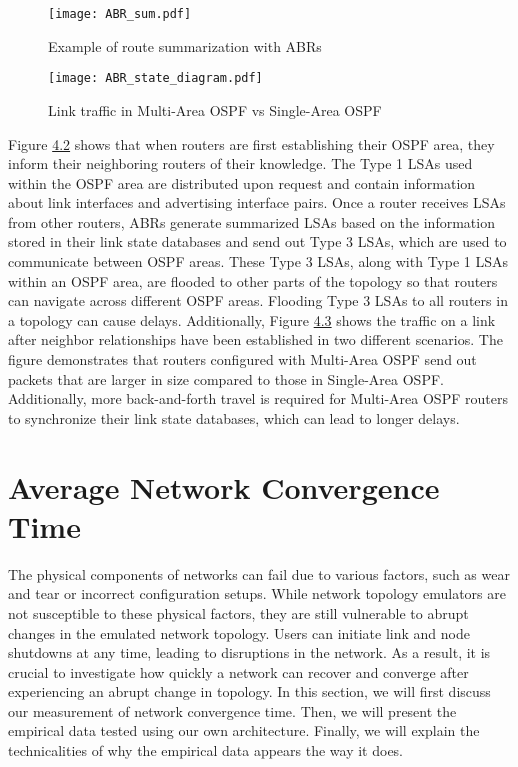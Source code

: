 \documentclass{uiucthesis2021}
\begin{document}
\label{f42}
\begin{figure}[H]
\texttt{[image: ABR\_sum.pdf]}
\centering
\caption{Example of route summarization with ABRs}
\centering
\end{figure}

\label{f43}
\begin{figure}[H]
\texttt{[image: ABR\_state\_diagram.pdf]}
\centering
\caption{Link traffic in Multi-Area OSPF vs Single-Area OSPF}
\centering
\end{figure}

\noindent Figure \hyperref[f42]{4.2} shows that when routers are first establishing their OSPF area, they inform their neighboring routers of their knowledge. The Type 1 LSAs used within the OSPF area are distributed upon request and contain information about link interfaces and advertising interface pairs. Once a router receives LSAs from other routers, ABRs generate summarized LSAs based on the information stored in their link state databases and send out Type 3 LSAs, which are used to communicate between OSPF areas. These Type 3 LSAs, along with Type 1 LSAs within an OSPF area, are flooded to other parts of the topology so that routers can navigate across different OSPF areas. Flooding Type 3 LSAs to all routers in a topology can cause delays. Additionally, Figure \hyperref[f43]{4.3} shows the traffic on a link after neighbor relationships have been established in two different scenarios. The figure demonstrates that routers configured with Multi-Area OSPF send out packets that are larger in size compared to those in Single-Area OSPF. Additionally, more back-and-forth travel is required for Multi-Area OSPF routers to synchronize their link state databases, which can lead to longer delays.  

\section{Average Network Convergence Time}
\noindent The physical components of networks can fail due to various factors, such as wear and tear or incorrect configuration setups. While network topology emulators are not susceptible to these physical factors, they are still vulnerable to abrupt changes in the emulated network topology. Users can initiate link and node shutdowns at any time, leading to disruptions in the network. As a result, it is crucial to investigate how quickly a network can recover and converge after experiencing an abrupt change in topology. In this section, we will first discuss our measurement of network convergence time. Then, we will present the empirical data tested using our own architecture. Finally, we will explain the technicalities of why the empirical data appears the way it does. \\
\end{document}

